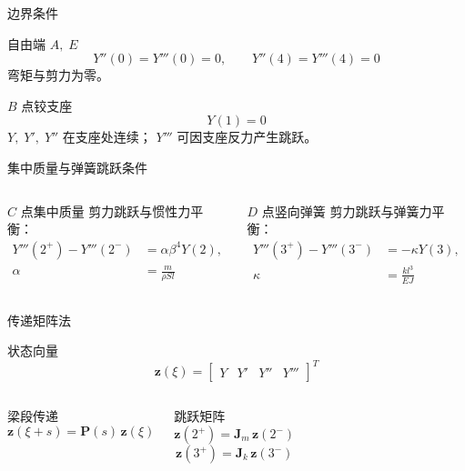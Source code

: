 \documentclass[UTF8,aspectratio=169,10pt]{ctexbeamer}
\begin{document}
\begin{frame}{边界条件}
  \begin{block}{自由端 $A,\;E$}
    \[
    Y''(0)=Y'''(0)=0,\qquad
    Y''(4)=Y'''(4)=0
    \]
    弯矩与剪力为零。
  \end{block}
  \vspace{0.5em}
  \begin{block}{$B$ 点铰支座}
    \[
    Y(1)=0
    \]
    $Y,\;Y',\;Y''$ 在支座处连续；
    $Y'''$ 可因支座反力产生跳跃。
  \end{block}
\end{frame}

\begin{frame}{集中质量与弹簧跳跃条件}
  \begin{columns}[T,onlytextwidth]
    \begin{block}{$C$ 点集中质量}
      剪力跳跃与惯性力平衡：
      \[
      \begin{aligned}
      Y'''(2^+)-Y'''(2^-)
      &=\alpha\beta^4Y(2),\\[0.3em]
      \alpha&=\frac{m}{\rho Sl}
      \end{aligned}
      \]
    \end{block}
    \begin{block}{$D$ 点竖向弹簧}
      剪力跳跃与弹簧力平衡：
      \[
      \begin{aligned}
      Y'''(3^+)-Y'''(3^-)
      &=-\kappa Y(3),\\[0.3em]
      \kappa&=\frac{kl^3}{EJ}
      \end{aligned}
      \]
    \end{block}
  \end{columns}
\end{frame}

\begin{frame}{传递矩阵法}
  \begin{block}{状态向量}
    \[
    \mathbf z(\xi)=
    \begin{bmatrix}
    Y & Y' & Y'' & Y'''
    \end{bmatrix}^{T}
    \]
  \end{block}
  \vspace{0.5em}
  \begin{columns}[T,onlytextwidth]
    \begin{block}{梁段传递}
      \[
      \mathbf z(\xi+s)=\mathbf P(s)\,\mathbf z(\xi)
      \]
    \end{block}
    \begin{block}{跳跃矩阵}
      \[
      \mathbf z(2^+)=\mathbf J_m\,\mathbf z(2^-)
      \]
      \[
      \mathbf z(3^+)=\mathbf J_k\,\mathbf z(3^-)
      \]
    \end{block}
  \end{columns}
\end{frame}
\end{document}

